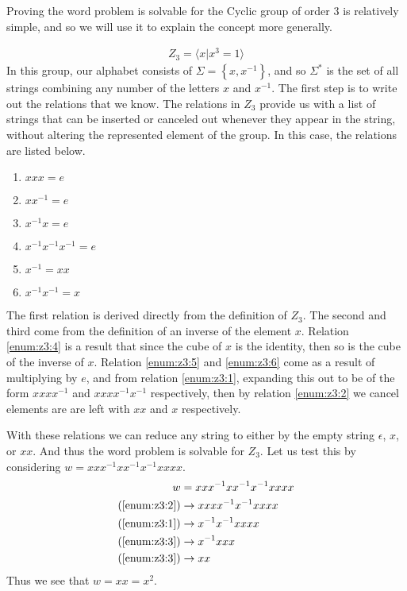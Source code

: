 \documentclass[10pt]{amsart}
\theoremstyle{definition}
\begin{document}
Proving the word problem is solvable for the Cyclic group of order 3 is
relatively simple, and so we will use it to explain the concept more generally.

\begin{align}
  Z_3=\langle x \vert x^3=1 \rangle
\end{align}
In this group, our alphabet consists of $\Sigma=\left\{x,x^{-1}\right\}$, and
so $\Sigma^*$ is the set of all strings combining any number of the letters $x$
and $x^{-1}$. The first step is to write out the relations that we know. The
relations in $Z_3$ provide us with a list of strings that can be inserted or
canceled out whenever they appear in the string, without altering the
represented element of the group. In this case, the relations are listed below.
\begin{multicols}{2}
  \begin{enumerate}
    \item $xxx= e$\label{enum:z3:1}
    \item $xx^{-1}= e$\label{enum:z3:2}
    \item $x^{-1}x= e$\label{enum:z3:3}
    \item $x^{-1}x^{-1}x^{-1}= e$\label{enum:z3:4}
    \item $x^{-1}= xx$\label{enum:z3:5}
    \item $x^{-1}x^{-1}= x$\label{enum:z3:6}
  \end{enumerate}
\end{multicols}
The first relation is derived directly from the definition of $Z_3$. The second
and third come from the definition of an inverse of the element $x$. Relation
\ref{enum:z3:4} is a result that since the cube of $x$ is the identity, then so
is the cube of the inverse of $x$. Relation \ref{enum:z3:5} and \ref{enum:z3:6}
come as a result of multiplying by $e$, and from relation \ref{enum:z3:1},
expanding this out to be of the form $xxxx^{-1}$ and $xxxx^{-1}x^{-1}$
respectively, then by relation \ref{enum:z3:2} we cancel elements are are left
with $xx$ and $x$ respectively.

With these relations we can reduce any string to either by the empty string
$\epsilon$, $x$, or $xx$. And thus the word problem is solvable for $Z_3$. Let
us test this by considering $w=xxx^{-1}xx^{-1}x^{-1}xxxx$.
\begin{align*}
  w&=xxx^{-1}xx^{-1}x^{-1}xxxx\\
  (\ref{enum:z3:2})&\rightarrow xxxx^{-1}x^{-1}xxxx\\
  (\ref{enum:z3:1})&\rightarrow x^{-1}x^{-1}xxxx\\
  (\ref{enum:z3:3})&\rightarrow x^{-1}xxx\\
  (\ref{enum:z3:3})&\rightarrow xx\\
\end{align*}
Thus we see that $w=xx=x^2$.
\end{document}
